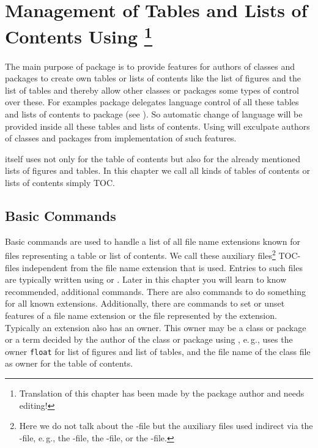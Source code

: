 \chapter[{Management of Tables and Lists of Contents Using
  \Package{tocbasic}}]
  {Management of Tables and Lists of Contents Using
  \protect\footnote{Translation of this chapter has been
    made by the package author and needs editing!}}
\BeginIndexGroup%
%
%
%
%
The main purpose of package  is to provide features for
authors of classes and packages to create own tables or lists of contents like
the list of figures and the list of tables and thereby allow other classes or
packages some types of control over these. For examples package
 delegates language control of all these tables and lists of
contents to package  (see
\cite{package:babel}). So automatic change of language will be provided
inside all these tables and lists of contents. Using  will
exculpate authors of classes and packages from implementation of such
features.

\KOMAScript{} itself uses  not only for the table of
contents but also for the already mentioned lists of figures and
tables. In this chapter we call all kinds of tables of contents
or lists of contents simply TOC.

\section{Basic Commands}
\label{sec:tocbasic.basics}

Basic commands are used to handle a list of all file name
extensions known for
files representing a table or list of contents. We call these auxiliary
files\footnote{Here we do not talk about the
  -file but the auxiliary files used indirect via the
  -file, e.\,g., the -file, the -file, or the
  -file.}  TOC-files
independent from the file name extension that is used. Entries to such files
are typically written using
 or . Later in this chapter
you will learn to know recommended, additional commands.  There are also
commands to do something for all known extensions. Additionally, there are
commands to set or unset features of a file name extension or the file
represented by the extension.  Typically an extension also has an
owner.  This owner may be a class or package or a term
decided by the author of the class or package using ,
e.\,g., \KOMAScript{} uses the owner \texttt{float} for list of figures and
list of tables, and the file name of the class file as owner for the table of
contents.

